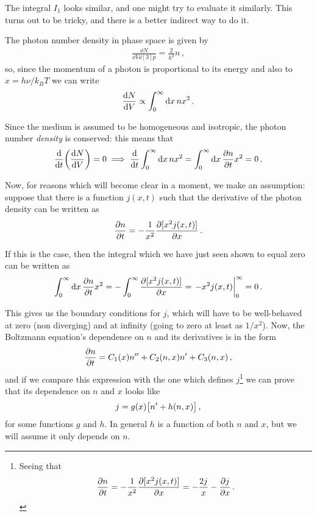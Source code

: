 \documentclass[main.tex]{subfiles}
\begin{document}
The integral \(I_1 \) looks similar, and one might try to evaluate it similarly. This turns out to be tricky, and there is a better indirect way to do it. 

The photon number density in phase space is given by 
%
\begin{align}
\frac{ \dd{N}}{ \dd{V} \dd[3]{p}} = \frac{2}{h^3} n
\,,
\end{align}
%
so, since the momentum of a photon is proportional to its energy and also to \(x = h \nu / k_B T\) we can write 
%
\begin{align}
\dv{N}{V} \propto \int_0^{\infty } \dd{x} n x^2
\,.
\end{align}


Since the medium is assumed to be homogeneous and isotropic, the photon number \emph{density} is conserved: this means that 
%
\begin{align}
\dv{}{t} \qty(\dv{N}{V}) = 0 
\implies
\dv{}{t} \int_0^{\infty } \dd{x} n x^2 = \int_0^{\infty } \dd{x} \pdv{n}{t} x^2 = 0
\,.
\end{align}

Now, for reasons which will become clear in a moment, we make an assumption: suppose that there is a function \(j(x, t )\) such that the derivative of the photon density can be written as 
%
\begin{align}
\pdv{n}{t} = - \frac{1}{x^2} \pdv{[x^2 j(x, t)]}{x}
\,.
\end{align}

If this is the case, then the integral which we have just seen shown to equal zero can be written as 
%
\begin{align}
\int_0^{\infty } \dd{x} \pdv{n}{t} x^2  = -\int_0^{\infty } \pdv{[x^2 j(x, t)]}{x}  = \eval{- x^2 j(x, t) }_{0}^{\infty } = 0
\,.
\end{align}

This gives us the boundary conditions for \(j\), which will have to be well-behaved at zero (non diverging) and at infinity (going to zero at least as \(1/x^2\)). 
Now, the Boltzmann equation's dependence on \(n\) and its derivatives is in the form 
%
\begin{align}
\pdv{n}{t} = C_1 (x ) n'' + C_2 (n, x) n' + C_3 (n, x)
\,,
\end{align}
%
and if we compare this expression with the one which defines \(j\)\footnote{Seeing that 
%
\begin{align}
\pdv{n}{t} = - \frac{1}{x^2} 
\pdv{[x^2 j(x, t)]}{x}
= - \frac{2j}{x} - \pdv{j}{x}
\,.
\end{align}
%
} we can prove that its dependence on \(n\) and \(x\) looks like 
%
\begin{align}
j = g(x) \qty[n' + h (n, x)]
\,,
\end{align}
%
for some functions \(g\) and \(h\). In general \(h\) is a function of both \(n\) and \(x\), but we will assume it only depends on \(n\). 
\end{document}
